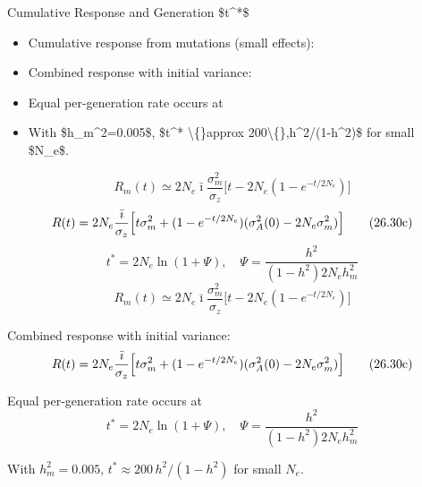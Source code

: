 \documentclass[10pt, aspectratio=169]{ctexbeamer}
\begin{document}
\begin{frame}{Cumulative Response and Generation \$t\textasciicircum{}*\$}
  \begin{itemize}
    \item Cumulative response from mutations (small effects):
    \item Combined response with initial variance:
    \item Equal per-generation rate occurs at
    \item With \$h\_m\textasciicircum{}2=0.005\$, \$t\textasciicircum{}* \textbackslash\{\}approx 200\textbackslash\{\},h\textasciicircum{}2/(1-h\textasciicircum{}2)\$ for small \$N\_e\$.
  \end{itemize}
  \[
    R_m(t) \simeq 2N_e\bar{\imath}\frac{\sigma_m^2}{\sigma_z}\bigl[t-2N_e(1-e^{-t/2N_e})\bigr] \tag{26.30a}
  \]
  \[
    R(t)=2N_e\frac{\bar{\imath}}{\sigma_z}\Bigl[t\sigma_m^2 + (1-e^{-t/2N_e})(\sigma_A^2(0)-2N_e\sigma_m^2)\Bigr] \tag{26.30c}
  \]
  \[
    t^* = 2N_e\ln(1+\Psi), \quad \Psi = \frac{h^2}{(1-h^2)2N_e h_m^2} \tag{26.31a,b}
  \]
  \[
    R_m(t) \simeq 2N_e\bar{\imath}\frac{\sigma_m^2}{\sigma_z}\bigl[t-2N_e(1-e^{-t/2N_e})\bigr] \tag{26.30a} \] \item<2-> Combined response with initial variance: \[ R(t)=2N_e\frac{\bar{\imath}}{\sigma_z}\Bigl[t\sigma_m^2 + (1-e^{-t/2N_e})(\sigma_A^2(0)-2N_e\sigma_m^2)\Bigr] \tag{26.30c} \] \item<3-> Equal per-generation rate occurs at \[ t^* = 2N_e\ln(1+\Psi), \quad \Psi = \frac{h^2}{(1-h^2)2N_e h_m^2} \tag{26.31a,b} \] \item<4-> With $h_m^2=0.005$, $t^* \approx 200\,h^2/(1-h^2)$ for small $N_e$.
  \]
\end{frame}
\end{document}

